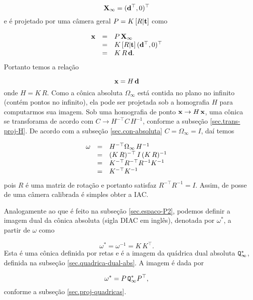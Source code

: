 \begin{equation*}
\mathbf{X}_\infty=({\bf d}^\top,0)^\top
\end{equation*} 
e é projetado por uma câmera geral $P=K\,[R|{\bf t}]$ como

\begin{equation*}
\begin{array}{rcl}
\mathbf{x}&=&P\,\mathbf{X}_\infty\\
&=&K\,[R|{\bf t}]\,({\bf d}^\top,0)^\top\\
&=&K\,R\,{\bf d}.
\end{array}
\end{equation*}
Portanto temos a relação

\begin{equation*}
\mathbf{x}=H\,{\bf d}
\end{equation*}
onde $H=K\,R$. Como a cônica absoluta $\Omega_\infty$ está contida no plano no infinito (contém pontos no infinito), ela pode ser projetada sob a homografia $H$ para computarmos sua imagem.
Sob uma homografia de ponto $\mathbf{x}\rightarrow H\,\mathbf{x}$, uma cônica se transforama de acordo com $C\rightarrow H^{-\top} C\,H^{-1}$, conforme a subseção \ref{sec.trans-proj-H}. De acordo com a subseção \ref{sec.con-absoluta} $C=\Omega_\infty =I$, daí temos

\begin{equation*}
\begin{array}{rcl}
{\bf \omega}&=&H^{-\top}\Omega_\infty\,H^{-1}\\
&=&(K\,R)^{-\top}\,I\,(K\,R)^{-1}\\
&=&K^{-\top}R^{-\top}R^{-1}K^{-1}\\
&=&K^{-\top}K^{-1}
\end{array}
\end{equation*}
pois $R$ é uma matriz de rotação e portanto satisfaz $R^{-\top}R^{-1}=I$. Assim, de posse de uma câmera calibrada é simples obter a IAC.

Analogamente ao que é feito na subseção \ref{sec.espaco-P2}, podemos definir a imagem dual da cônica absoluta (sigla DIAC em inglês), denotada por $\omega^*$, a partir de $\omega$ como

\begin{equation*}
\omega^*=\omega^{-1}=K\,K^\top.
\end{equation*}
Esta é uma cônica definida por retas e é a imagem da quádrica dual absoluta ${\tt Q^*_\infty}$, definida na subseção \ref{sec.quadrica-dual-abs}. A imagem é dada por

\begin{equation*}
\omega^*=P\,{\tt Q^*_\infty}P^\top,
\end{equation*}
conforme a subseção \ref{sec.proj-quadricas}.\\


